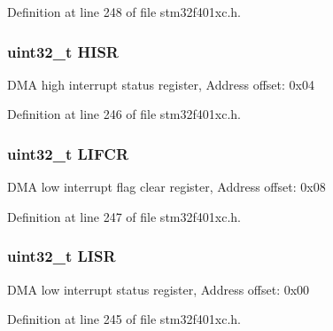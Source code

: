 Definition at line 248 of file stm32f401xc.\+h.

\subsubsection[{\texorpdfstring{H\+I\+SR}{HISR}}]{ uint32\+\_\+t H\+I\+SR}\hypertarget{struct_d_m_a___type_def_a6fe40f7ac1a18c2726b328b5ec02b262}{}\label{struct_d_m_a___type_def_a6fe40f7ac1a18c2726b328b5ec02b262}
D\+MA high interrupt status register, Address offset\+: 0x04 

Definition at line 246 of file stm32f401xc.\+h.

\subsubsection[{\texorpdfstring{L\+I\+F\+CR}{LIFCR}}]{ uint32\+\_\+t L\+I\+F\+CR}\hypertarget{struct_d_m_a___type_def_ac4f7bf4cb172024bfc940c00167cd04e}{}\label{struct_d_m_a___type_def_ac4f7bf4cb172024bfc940c00167cd04e}
D\+MA low interrupt flag clear register, Address offset\+: 0x08 

Definition at line 247 of file stm32f401xc.\+h.

\subsubsection[{\texorpdfstring{L\+I\+SR}{LISR}}]{ uint32\+\_\+t L\+I\+SR}\hypertarget{struct_d_m_a___type_def_a5cdef358e9e95b570358e1f6a3a7f492}{}\label{struct_d_m_a___type_def_a5cdef358e9e95b570358e1f6a3a7f492}
D\+MA low interrupt status register, Address offset\+: 0x00 

Definition at line 245 of file stm32f401xc.\+h.



